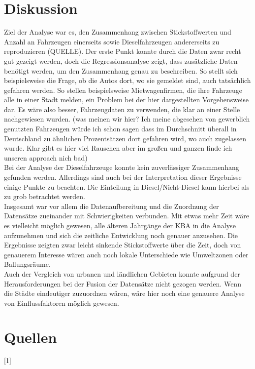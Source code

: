 \documentclass[11pt,a4paper,oneside,german]{article}
\begin{document}
	\section{Diskussion}
	
	Ziel der Analyse war es, den Zusammenhang zwischen Stickstoffwerten und Anzahl an Fahrzeugen einerseits sowie Dieselfahrzeugen andererseits zu reproduzieren (QUELLE). Der erste Punkt konnte durch die Daten zwar recht gut gezeigt werden, doch die Regressionsanalyse zeigt, dass zusätzliche Daten benötigt werden, um den Zusammenhang genau zu beschreiben. So stellt sich beispielsweise die Frage, ob die Autos dort, wo sie gemeldet sind, auch tatsächlich gefahren werden. So stellen beispielsweise Mietwagenfirmen, die ihre Fahrzeuge alle in einer Stadt melden, ein Problem bei der hier dargestellten Vorgehensweise dar. Es wäre also besser, Fahrzeugdaten zu verwenden, die klar an einer Stelle nachgewiesen wurden. (was meinen wir hier? Ich meine abgesehen von gewerblich genutzten Fahrzeugen würde ich schon sagen dass im Durchschnitt überall in Deutschland zu ähnlichen Prozentsätzen dort gefahren wird, wo auch zugelassen wurde. Klar gibt es hier viel Rauschen aber im großen und ganzen finde ich unseren approach nich bad) \\
	Bei der Analyse der Dieselfahrzeuge konnte kein zuverlässiger Zusammenhang gefunden werden. Allerdings sind auch bei der Interpretation dieser Ergebnisse einige Punkte zu beachten. Die Einteilung in Diesel/Nicht-Diesel kann hierbei als zu grob betrachtet werden. \\
	Insgesamt war vor allem die Datenaufbereitung und die Zuordnung der Datensätze zueinander mit Schwierigkeiten verbunden. Mit etwas mehr Zeit wäre es vielleicht möglich gewesen, alle älteren Jahrgänge der KBA in die Analyse aufzunehmen und sich die zeitliche Entwicklung noch genauer anzusehen. Die Ergebnisse zeigten zwar leicht sinkende Stickstoffwerte über die Zeit, doch von genauerem Interesse wären auch noch lokale Unterschiede wie Umweltzonen oder Ballungsräume. \\
	Auch der Vergleich von urbanen und ländlichen Gebieten konnte aufgrund der Herausforderungen bei der Fusion der Datensätze nicht gezogen werden. Wenn die Städte eindeutiger zuzuordnen wären, wäre hier noch eine genauere Analyse von Einflussfaktoren möglich gewesen. \\
	
	\section{Quellen}
	
	[1]
	
\end{document}
